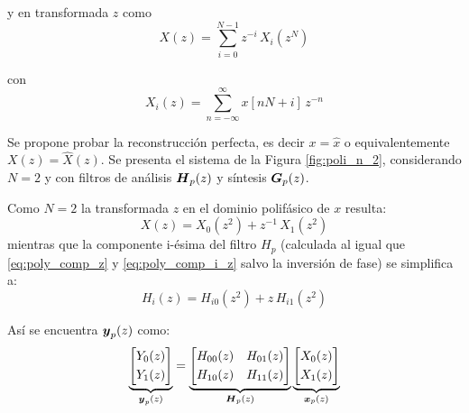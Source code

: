		y en transformada $z$ como 
		\begin{equation} %
			X(z)= \sum^{N-1}_{i=0} z^{-i} \, X_i(z^N)
			\label{eq:poly_comp_z}
		\end{equation}
		
		con
		\begin{equation} %
			X_i(z)=\sum^{\infty}_{n=-\infty} x[nN+ i]\, z^{-n}
			\label{eq:poly_comp_i_z}
		\end{equation}

	Se propone probar la reconstrucción perfecta, es decir $x = \hat{x}$ o equivalentemente $X(z) = \hat{X}(z)$. Se presenta el sistema de la Figura \ref{fig:poli_n_2}, considerando $N=2$ y con filtros de análisis $\boldsymbol{H}_p(z)$ y síntesis $\boldsymbol{G}_p(z)$. 

	Como $N=2$ la transformada $z$ en el dominio polifásico de $x$ resulta:
		\begin{equation}
			X(z) = X_0 (z^2) + z^{-1}\, X_1 (z^2)
			\label{eq:xp_z}
		\end{equation}
	mientras que la componente i-ésima del filtro $H_p$ (calculada al igual que \eqref{eq:poly_comp_z} y \eqref{eq:poly_comp_i_z} salvo la inversión de fase) se simplifica a:
		\begin{equation}
			H_i(z) = H_{i0} (z^2) + z\, H_{i1} (z^2)
			\label{eq:hpi_z}
		\end{equation}

		Así se encuentra $\boldsymbol{y}_p(z)$ como:
		\begin{equation}
		\underbrace{\begin{bmatrix} Y_0(z)\\[0.3em] Y_1(z) \end{bmatrix}}_{\boldsymbol{y}_p(z)} = \underbrace{\begin{bmatrix} H_{00}(z) & H_{01}(z) \\[0.3em] H_{10}(z) & H_{11}(z) \end{bmatrix}}_{\boldsymbol{H}_p(z)} \underbrace{\begin{bmatrix} X_0(z) \\[0.3em] X_1(z) \end{bmatrix}}_{\boldsymbol{x}_p(z)}
			\label{eq:in_poly_z}
		\end{equation}

